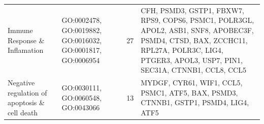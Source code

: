 \documentclass[9pt,twocolumn,twoside]{gsajnl}
\begin{document}
\begin{table}[htbp]
\begin{tableminipage}{\textwidth}
\begin{tabularx}{\textwidth}{m{3cm}m{3.5cm}m{1.2cm}m{9.2cm}}
Immune Response \& Inflamation & GO:0002478, GO:0019882, GO:0016032, GO:0001817, GO:0006954  & 27 & CFH, PSMD3, GSTP1, FBXW7, RPS9,  COPS6, PSMC1, POLR3GL,  APOL2, ASB1, SNF8, APOBEC3F, PSMD4, CTSD, BAX, ZCCHC11, RPL27A,  POLR3C, LIG4, PTGER3, APOL3, USP7, PIN1, SEC31A, CTNNB1, CCL8, CCL5\\

Negative regulation of apoptosis \& cell death & GO:0030111, GO:0060548, GO:0043066  & 13 & MYDGF, CYR61, WIF1, CCL5, PSMC1,  ATF5, BAX, PSMD3, CTNNB1, GSTP1, PSMD4, LIG4, ATF5\\

\hline
\end{tabularx}
  \label{tab:over}
\end{tableminipage}
\end{table}
\end{document}
